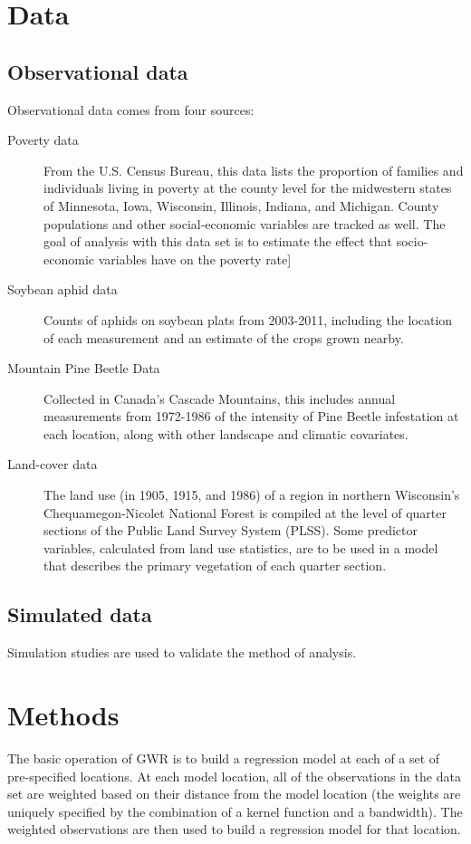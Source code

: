 \documentclass[10pt]{amsart}
\begin{document}
\section{Data}
	\subsection{Observational data}
		Observational data comes from four sources:\\
		
		\begin{description}
			\item[Poverty data] From the U.S. Census Bureau, this data lists the proportion of families and individuals living in poverty at the county level for the midwestern states of Minnesota, Iowa, Wisconsin, Illinois, Indiana, and Michigan. County populations and other social-economic variables are tracked as well. The goal of analysis with this data set is to estimate the effect that socio-economic variables have on the poverty rate]
			\item[Soybean aphid data] Counts of aphids on soybean plats from 2003-2011, including the location of each measurement and an estimate of the crops grown nearby.
			\item[Mountain Pine Beetle Data] Collected in Canada's Cascade Mountains, this includes annual measurements from 1972-1986 of the intensity of Pine Beetle infestation at each location, along with other landscape and climatic covariates.
			\item[Land-cover data] The land use (in 1905, 1915, and 1986) of a region in northern Wisconsin's Chequamegon-Nicolet National Forest is compiled at the level of quarter sections of the Public Land Survey System (PLSS). Some predictor variables, calculated from land use statistics, are to be used in a model that describes the primary vegetation of each quarter section.
		\end{description}
  
	\subsection{Simulated data}
		Simulation studies are used to validate the method of analysis.\\
	

\section{Methods}
	The basic operation of GWR is to build a regression model at each of a set of pre-specified locations. At each model location, all of the observations in the data set are weighted based on their distance from the model location (the weights are uniquely specified by the combination of a kernel function and a bandwidth). The weighted observations are then used to build a regression model for that location.\\
	
\end{document}

